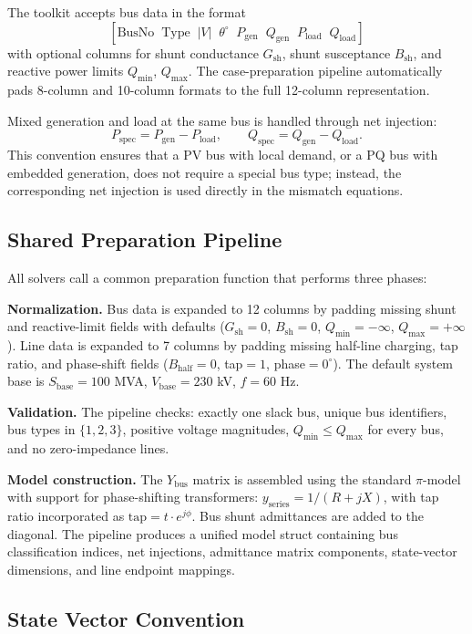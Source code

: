 \documentclass[12pt,a4paper]{article}
\begin{document}
The toolkit accepts bus data in the format
\[
[\text{BusNo} \;\; \text{Type} \;\; |V| \;\; \theta^\circ \;\; P_{\text{gen}} \;\; Q_{\text{gen}} \;\; P_{\text{load}} \;\; Q_{\text{load}}]
\]
with optional columns for shunt conductance $G_{\text{sh}}$, shunt susceptance $B_{\text{sh}}$, and reactive power limits $Q_{\min}$, $Q_{\max}$. The case-preparation pipeline automatically pads 8-column and 10-column formats to the full 12-column representation.

Mixed generation and load at the same bus is handled through net injection:
\[
P_{\text{spec}} = P_{\text{gen}} - P_{\text{load}}, \qquad
Q_{\text{spec}} = Q_{\text{gen}} - Q_{\text{load}}.
\]
This convention ensures that a PV bus with local demand, or a PQ bus with embedded generation, does not require a special bus type; instead, the corresponding net injection is used directly in the mismatch equations.

\subsection{Shared Preparation Pipeline}

All solvers call a common preparation function that performs three phases:

\textbf{Normalization.} Bus data is expanded to 12 columns by padding missing shunt and reactive-limit fields with defaults ($G_{\text{sh}}=0$, $B_{\text{sh}}=0$, $Q_{\min}=-\infty$, $Q_{\max}=+\infty$). Line data is expanded to 7 columns by padding missing half-line charging, tap ratio, and phase-shift fields ($B_{\text{half}}=0$, tap$=1$, phase$=0^\circ$). The default system base is $S_{\text{base}}=100$ MVA, $V_{\text{base}}=230$ kV, $f=60$ Hz.

\textbf{Validation.} The pipeline checks: exactly one slack bus, unique bus identifiers, bus types in $\{1,2,3\}$, positive voltage magnitudes, $Q_{\min} \le Q_{\max}$ for every bus, and no zero-impedance lines.

\textbf{Model construction.} The $Y_{\text{bus}}$ matrix is assembled using the standard $\pi$-model with support for phase-shifting transformers: $y_{\text{series}} = 1/(R+jX)$, with tap ratio incorporated as $\text{tap} = t \cdot e^{j\phi}$. Bus shunt admittances are added to the diagonal. The pipeline produces a unified model struct containing bus classification indices, net injections, admittance matrix components, state-vector dimensions, and line endpoint mappings.

\subsection{State Vector Convention}
\end{document}
